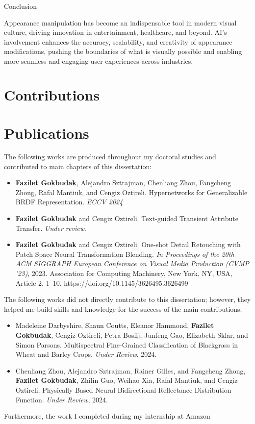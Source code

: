 Conclusion

Appearance manipulation has become an indispensable tool in modern visual culture, driving innovation in entertainment, healthcare, and beyond. AI's involvement enhances the accuracy, scalability, and creativity of appearance modifications, pushing the boundaries of what is visually possible and enabling more seamless and engaging user experiences across industries.




\section{Contributions}
\section{Publications}

The following works are produced throughout my doctoral studies and contributed to main chapters of this dissertation:

\begin{itemize}

\item \textbf{Fazilet Gokbudak}, Alejandro Sztrajman, Chenliang Zhou,  Fangcheng Zhong, Rafal Mantiuk, and Cengiz Oztireli. Hypernetworks for Generalizable BRDF Representation. \textit{ECCV 2024}

\item \textbf{Fazilet Gokbudak} and Cengiz Oztireli. Text-guided Transient Attribute Transfer. \textit{Under review}.

\item \textbf{Fazilet Gokbudak} and Cengiz Oztireli. One-shot Detail Retouching with Patch Space Neural Transformation Blending. \textit{In Proceedings of the 20th ACM SIGGRAPH European Conference on Visual Media Production (CVMP '23)}, 2023. Association for Computing Machinery, New York, NY, USA, Article 2, 1–10. https://doi.org/10.1145/3626495.3626499

\end{itemize}

The following works did not directly contribute to this dissertation; however, they helped me build skills and knowledge for the success of the main contributions:

\begin{itemize}

\item Madeleine Darbyshire, Shaun Coutts, Eleanor Hammond, \textbf{Fazilet Gokbudak}, Cengiz Oztireli, Petra Bosilj, Junfeng Gao, Elizabeth Sklar, and Simon Parsons. Multispectral Fine-Grained Classification of Blackgrass in Wheat and Barley Crops. \textit{Under Review}, 2024.

\item Chenliang Zhou, Alejandro Sztrajman, Rainer Gilles, and Fangcheng Zhong, \textbf{Fazilet Gokbudak}, Zhilin Guo, Weihao Xia, Rafal Mantiuk, and Cengiz Oztireli. Physically Based Neural Bidirectional Reflectance Distribution Function. \textit{Under Review}, 2024.

\end{itemize}

Furthermore, the work I completed during my internship at Amazon 